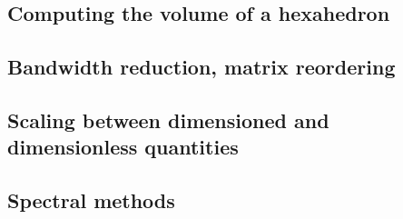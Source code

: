 \subsection{Computing the volume of a hexahedron}  %
\newpage %
\subsection{Bandwidth reduction, matrix reordering}  %
\newpage %
\subsection{Scaling between dimensioned and dimensionless quantities} 

\newpage %
\subsection{Spectral methods} 



